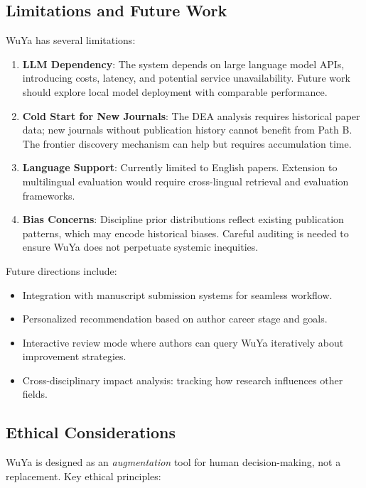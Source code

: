 \documentclass[11pt,a4paper]{article}
\newcommand{\dea}{DEA}
\begin{document}
\subsection{Limitations and Future Work}

WuYa has several limitations:

\begin{enumerate}
    \item \textbf{LLM Dependency}: The system depends on large language model APIs, introducing costs, latency, and potential service unavailability. Future work should explore local model deployment with comparable performance.

    \item \textbf{Cold Start for New Journals}: The \dea{} analysis requires historical paper data; new journals without publication history cannot benefit from Path B. The frontier discovery mechanism can help but requires accumulation time.

    \item \textbf{Language Support}: Currently limited to English papers. Extension to multilingual evaluation would require cross-lingual retrieval and evaluation frameworks.

    \item \textbf{Bias Concerns}: Discipline prior distributions reflect existing publication patterns, which may encode historical biases. Careful auditing is needed to ensure WuYa does not perpetuate systemic inequities.
\end{enumerate}

Future directions include:
\begin{itemize}
    \item Integration with manuscript submission systems for seamless workflow.
    \item Personalized recommendation based on author career stage and goals.
    \item Interactive review mode where authors can query WuYa iteratively about improvement strategies.
    \item Cross-disciplinary impact analysis: tracking how research influences other fields.
\end{itemize}

\subsection{Ethical Considerations}

WuYa is designed as an \textit{augmentation} tool for human decision-making, not a replacement. Key ethical principles:
\end{document}

